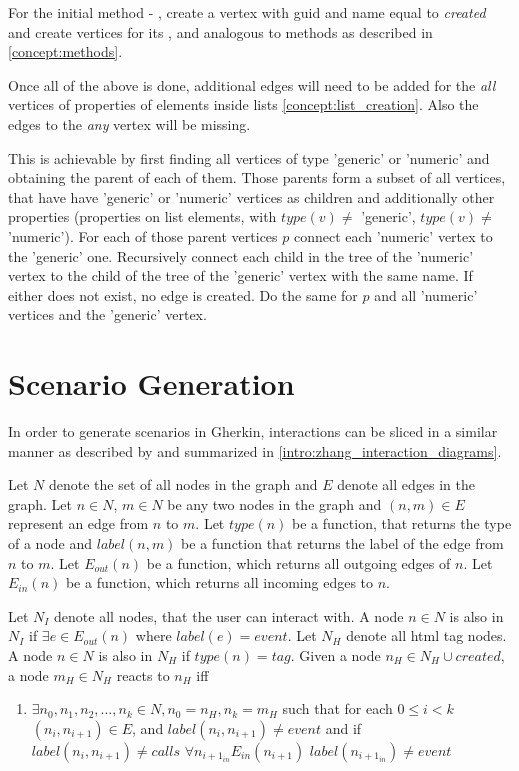 For the initial method - , create a vertex with \gls{guid} and name equal to \textit{created} and create vertices for its ,  and  analogous to methods as described in \ref{concept:methods}. 


Once all of the above is done, additional edges will need to be added for the \textit{all} vertices of properties of elements inside lists \ref{concept:list_creation}. Also the edges to the \textit{any} vertex will be missing. 

This is achievable by first finding all vertices of type 'generic' or 'numeric' and obtaining the parent of each of them. Those parents form a subset of all vertices, that have have 'generic' or 'numeric' vertices as children and additionally other properties (properties on list elements, with $type(v) \neq$ 'generic', $type(v) \neq$ 'numeric'). 
For each of those parent vertices $p$ connect each 'numeric' vertex to the 'generic' one. Recursively connect each child in the tree of the 'numeric' vertex to the child of the tree of the 'generic' vertex with the same name. If either does not exist, no edge is created. Do the same for $p$ and all 'numeric' vertices and the 'generic' vertex.

\section{Scenario Generation}
\label{concept:scenario_generation}
In order to generate scenarios in Gherkin, interactions can be sliced in a similar manner as described by \textcite{zhang2019scenario} and summarized in \ref{intro:zhang_interaction_diagrams}.

Let $N$ denote the set of all nodes in the graph and $E$ denote all edges in the graph. Let $n \in N$, $m \in N$ be any two nodes in the graph and $(n, m) \in E $ represent an edge from $n$ to $m$. Let $type(n)$ be a function, that returns the type of a node and $label(n, m)$ be a function that returns the label of the edge from $n$ to $m$. Let $E_{out}(n)$ be a function, which returns all outgoing edges of $n$.
Let $E_{in}(n)$ be a function, which returns all incoming edges to $n$.

Let $N_I$ denote all nodes, that the user can interact with. A node $n \in N$ is also in $N_I$ if $\exists e \in E_{out}(n)$ where $label(e) = event$. Let $N_H$ denote all html tag nodes. A node $n \in N$ is also in $N_H$ if $type(n) = tag$. 
Given a node $n_H \in N_H \cup {created}$, a node $m_H \in N_H$ reacts to $n_H$ iff
\begin{enumerate}
    \item $\exists n_0,n_1,n_2, \ldots,n_k \in N, n_0=n_H,n_k=m_H$ such that for each $0 \leq i < k  $ $(n_i,n_{i+1}) \in E$, and $label(n_i,n_{i+1})\neq event$ and if $label(n_i,n_{i+1}) \neq calls$ $\forall n_{i+1_{in}} E_{in}(n_{i+1})$ $label(n_{i+1_{in}}) \neq event$ 
\end{enumerate}


